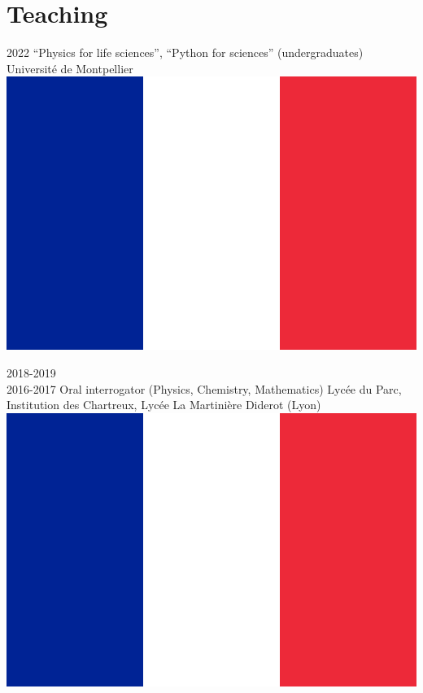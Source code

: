 \documentclass[a4paper]{cvtemplate_en} %
\begin{document}
\section{Teaching}

\begin{cvbody}

\cvitem
	{2022}
	{}
	{``Physics for life sciences'', ``Python for sciences'' (undergraduates)}
	{Université de Montpellier \includegraphics[height=0.8\myheight]{fr}\vspace{-5pt}}
	{}{}{}
	{}
	{\vspace{5pt}}

\cvitem
	{2018-2019\\ \mbox{}\hfill 2016-2017}
	{}
	{Oral interrogator (Physics, Chemistry, Mathematics)}
	{Lyc\'ee du Parc, Institution des Chartreux, Lyc\'ee La Martinière Diderot (Lyon) \includegraphics[height=0.8\myheight]{fr}}
	{}{}{}
	{}
	{\vspace{5pt}
	}


\end{cvbody}
\end{document}
